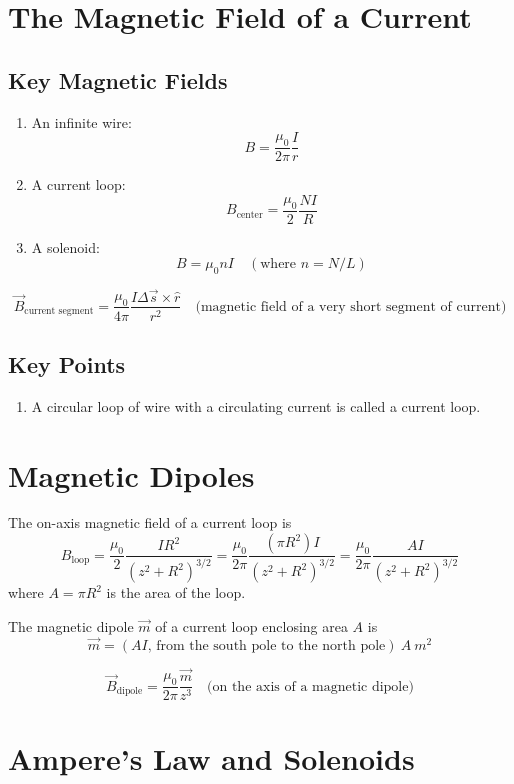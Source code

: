 \documentclass{article}
\begin{document}
\section*{The Magnetic Field of a Current}

\subsection*{Key Magnetic Fields}
\begin{enumerate}
    \item An infinite wire: \[B=\frac{\mu_0}{2\pi}\frac{I}{r}\]
    \item A current loop: \[B_\text{center}=\frac{\mu_0}{2}\frac{NI}{R}\]
    \item A solenoid: \[B=\mu_0 nI\quad(\text{where }n=N/L)\]
\end{enumerate}

\[\vec{B}_\text{current segment}=\frac{\mu_0}{4\pi}\frac{I\Delta \vec{s}\times \hat{r}}{r^2}
\quad\text{(magnetic field of a very short segment of current)}\]

\subsection*{Key Points}
\begin{enumerate}
    \item A circular loop of wire with a circulating current is called a current loop.
\end{enumerate}

\section*{Magnetic Dipoles}
The on-axis magnetic field of a current loop is
\[B_\text{loop}=\frac{\mu_0}{2}\frac{IR^2}{{(z^2+R^2)}^{3/2}}=\frac{\mu_0}{2\pi}\frac{(\pi R^2)I}
{{(z^2+R^2)}^{3/2}}=\frac{\mu_0}{2\pi}\frac{AI}{{(z^2+R^2)}^{3/2}}\]
where $A=\pi R^2$ is the area of the loop. 

\vspace{1em}

The magnetic dipole $\vec{m}$ of a current loop enclosing area $A$ is 
\[\vec{m}=(AI\text{, from the south pole to the north pole})\: A\: m^2\]

\[\vec{B}_\text{dipole}=\frac{\mu_0}{2\pi}\frac{\vec{m}}{z^3}\quad
\text{(on the axis of a magnetic dipole)}\]

\pagebreak

\section*{Ampere's Law and Solenoids}
\end{document}
